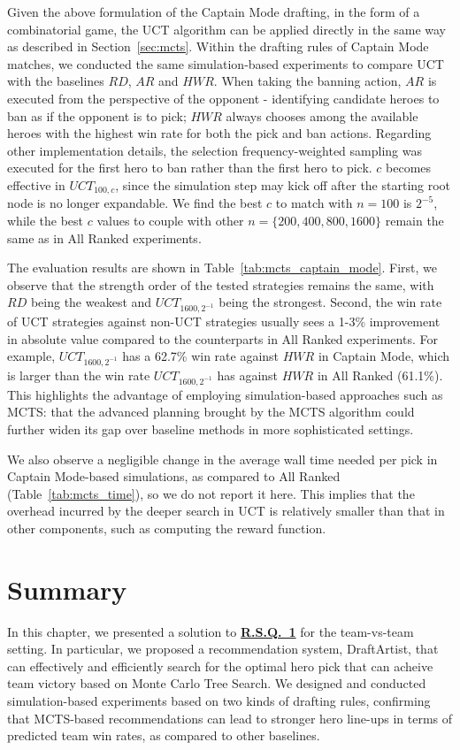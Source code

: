 Given the above formulation of the Captain Mode drafting, in the form of a combinatorial game, the UCT algorithm can be applied directly in the same way as described in Section~\ref{sec:mcts}. Within the drafting rules of Captain Mode matches, we conducted the same simulation-based experiments to compare UCT with the baselines $RD$, $AR$ and $HWR$. When taking the banning action, $AR$ is executed from the perspective of the opponent - identifying candidate heroes to ban as if the opponent is to pick; $HWR$ always chooses among the available heroes with the highest win rate for both the pick and ban actions. Regarding other implementation details, the selection frequency-weighted sampling was executed for the first hero to ban rather than the first hero to pick. $c$ becomes effective in $UCT_{100, c}$, since the simulation step may kick off after the starting root node is no longer expandable. We find the best $c$ to match with ${n=100}$ is $2^{-5}$, while the best $c$ values to couple with other ${n=\{200, 400, 800, 1600\}}$ remain the same as in All Ranked experiments.

The evaluation results are shown in Table~\ref{tab:mcts_captain_mode}. First, we observe that the strength order of the tested strategies remains the same, with $RD$ being the weakest and $UCT_{1600, 2^{-1}}$ being the strongest. Second, the win rate of UCT strategies against non-UCT strategies usually sees a 1-3\%  improvement in absolute value compared to the counterparts in All Ranked experiments. For example, $UCT_{1600, 2^{-1}}$ has a 62.7\% win rate against $HWR$ in Captain Mode, which is larger than the win rate $UCT_{1600, 2^{-1}}$ has against $HWR$ in All Ranked (61.1\%). This highlights the advantage of employing simulation-based approaches such as MCTS: that the advanced planning brought by the MCTS algorithm could further widen its gap over baseline methods in more sophisticated settings.

We also observe a negligible change in the average wall time needed per pick in Captain Mode-based simulations, as compared to All Ranked (Table~\ref{tab:mcts_time}), so we do not report it here. This implies that the overhead incurred by the deeper search in UCT is relatively smaller than that in other components, such as computing the reward function. 


\section{Summary}

In this chapter, we presented a solution to \hyperref[rq1]{\textbf{R.S.Q.~1}} for the team-vs-team setting. In particular, we proposed a recommendation system, DraftArtist, that can effectively and efficiently search for the optimal hero pick that can acheive team victory based on Monte Carlo Tree Search. We designed and conducted simulation-based experiments based on two kinds of drafting rules, confirming that MCTS-based recommendations can lead to stronger hero line-ups in terms of predicted team win rates, as compared to other baselines. 

